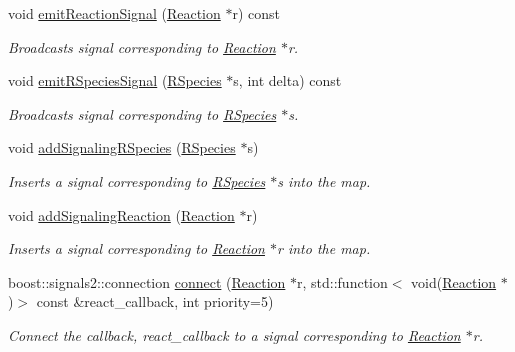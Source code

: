 \begin{DoxyCompactItemize}
\item 
void \hyperlink{classchem_1_1ChemSignal_ac5b8c53bc05689305d036f515777e072}{emit\-Reaction\-Signal} (\hyperlink{classchem_1_1Reaction}{Reaction} $\ast$r) const 
\begin{DoxyCompactList}\small\item\em Broadcasts signal corresponding to \hyperlink{classchem_1_1Reaction}{Reaction} $\ast$r. \end{DoxyCompactList}\item 
void \hyperlink{classchem_1_1ChemSignal_ab27c28368d6fab40f2d50129108a15bc}{emit\-R\-Species\-Signal} (\hyperlink{classchem_1_1RSpecies}{R\-Species} $\ast$s, int delta) const 
\begin{DoxyCompactList}\small\item\em Broadcasts signal corresponding to \hyperlink{classchem_1_1RSpecies}{R\-Species} $\ast$s. \end{DoxyCompactList}\item 
void \hyperlink{classchem_1_1ChemSignal_a9c370cbe1e3376366c95e95c4aa512e9}{add\-Signaling\-R\-Species} (\hyperlink{classchem_1_1RSpecies}{R\-Species} $\ast$s)
\begin{DoxyCompactList}\small\item\em Inserts a signal corresponding to \hyperlink{classchem_1_1RSpecies}{R\-Species} $\ast$s into the map. \end{DoxyCompactList}\item 
void \hyperlink{classchem_1_1ChemSignal_adf84ffb7d6ede4c06b2fdae0d0479e04}{add\-Signaling\-Reaction} (\hyperlink{classchem_1_1Reaction}{Reaction} $\ast$r)
\begin{DoxyCompactList}\small\item\em Inserts a signal corresponding to \hyperlink{classchem_1_1Reaction}{Reaction} $\ast$r into the map. \end{DoxyCompactList}\item 
boost\-::signals2\-::connection \hyperlink{classchem_1_1ChemSignal_ad8a6896f460632c3aa70bb8f1426808b}{connect} (\hyperlink{classchem_1_1Reaction}{Reaction} $\ast$r, std\-::function$<$ void(\hyperlink{classchem_1_1Reaction}{Reaction} $\ast$)$>$ const \&react\-\_\-callback, int priority=5)
\begin{DoxyCompactList}\small\item\em Connect the callback, react\-\_\-callback to a signal corresponding to \hyperlink{classchem_1_1Reaction}{Reaction} $\ast$r. \end{DoxyCompactList}\item 

\end{DoxyCompactItemize}
